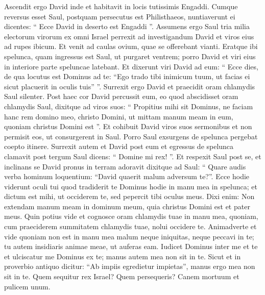 \begin{biblechapter}
\begin{biblechapter}
\begin{biblechapter}
\begin{biblechapter}
\begin{biblechapter}
\begin{biblechapter}
\begin{biblechapter}
\begin{biblechapter}
\begin{biblechapter}
\begin{biblechapter}
\begin{biblechapter}
\begin{biblechapter}
\begin{biblechapter}
\begin{biblechapter}
\begin{biblechapter}
\begin{biblechapter}
\begin{biblechapter}
\begin{biblechapter}
\begin{biblechapter}
\begin{biblechapter}
\begin{biblechapter}
\begin{biblechapter}
\begin{biblechapter}
\begin{biblechapter}
\verse Ascendit ergo David inde et habitavit in locis tutissimis Engaddi. 
\verse Cumque reversus esset Saul, postquam persecutus est Philisthaeos, nuntiaverunt ei dicentes: “ Ecce David in deserto est Engaddi ”. 
\verse Assumens ergo Saul tria milia electorum virorum ex omni Israel perrexit ad investigandum David et viros eius ad rupes ibicum. 
\verse Et venit ad caulas ovium, quae se offerebant vianti.
 Eratque ibi spelunca, quam ingressus est Saul, ut purgaret ventrem; porro David et viri eius in interiore parte speluncae latebant. 
\verse Et dixerunt viri David ad eum: “ Ecce dies, de qua locutus est Dominus ad te: “Ego trado tibi inimicum tuum, ut facias ei sicut placuerit in oculis tuis” ”. Surrexit ergo David et praecidit oram chlamydis Saul silenter. 
\verse Post haec cor David percussit eum, eo quod abscidisset oram chlamydis Saul, 
\verse dixitque ad viros suos: “ Propitius mihi sit Dominus, ne faciam hanc rem domino meo, christo Domini, ut mittam manum meam in eum, quoniam christus Domini est ”. 
\verse Et cohibuit David viros suos sermonibus et non permisit eos, ut consurgerent in Saul.
 Porro Saul exsurgens de spelunca pergebat coepto itinere. 
\verse Surrexit autem et David post eum et egressus de spelunca clamavit post tergum Saul dicens: “ Domine mi rex! ”. Et respexit Saul post se, et inclinans se David pronus in terram adoravit 
\verse dixitque ad Saul: “ Quare audis verba hominum loquentium: “David quaerit malum adversum te?”. 
\verse Ecce hodie viderunt oculi tui quod tradiderit te Dominus hodie in manu mea in spelunca; et dictum est mihi, ut occiderem te, sed pepercit tibi oculus meus. Dixi enim: Non extendam manum meam in dominum meum, quia christus Domini est 
\verse et pater meus. Quin potius vide et cognosce oram chlamydis tuae in manu mea, quoniam, cum praeciderem summitatem chlamydis tuae, nolui occidere te. Animadverte et vide quoniam non est in manu mea malum neque iniquitas, neque peccavi in te; tu autem insidiaris animae meae, ut auferas eam. 
\verse Iudicet Dominus inter me et te et ulciscatur me Dominus ex te; manus autem mea non sit in te. 
\verse Sicut et in proverbio antiquo dicitur: “Ab impiis egredietur impietas”, manus ergo mea non sit in te. 
\verse Quem sequitur rex Israel? Quem persequeris? Canem mortuum et pulicem unum. 

\end{biblechapter}
\end{biblechapter}
\end{biblechapter}
\end{biblechapter}
\end{biblechapter}
\end{biblechapter}
\end{biblechapter}
\end{biblechapter}
\end{biblechapter}
\end{biblechapter}
\end{biblechapter}
\end{biblechapter}
\end{biblechapter}
\end{biblechapter}
\end{biblechapter}
\end{biblechapter}
\end{biblechapter}
\end{biblechapter}
\end{biblechapter}
\end{biblechapter}
\end{biblechapter}
\end{biblechapter}
\end{biblechapter}
\end{biblechapter}
